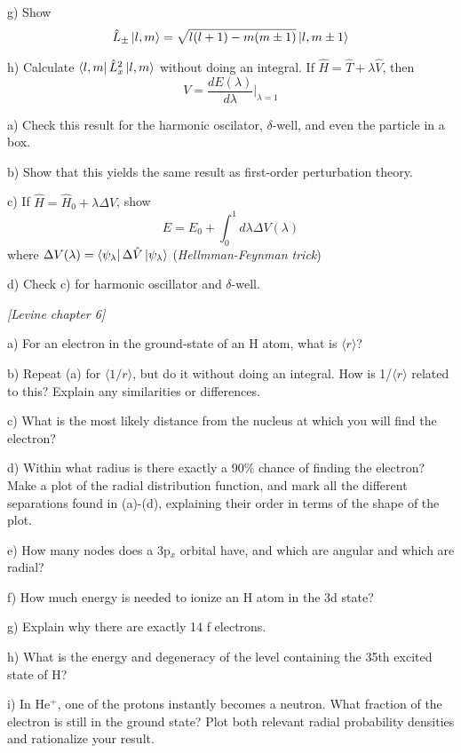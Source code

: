 g) Show
\begin{align*}
\hat{L}_{\pm}\ket{l,m} = \sqrt{l(l+1)-m(m\pm1)}\ket{l,m\pm1}
\end{align*}

h) Calculate $\bra{l,m}\hat{L}^2_x\ket{l,m}$ without doing an integral.
\newpage
{}
If $\hat{H}=\hat{T} + \lambda\hat{V}$, then
$$V = \frac{dE(\lambda)}{d\lambda}\bigg|_{\lambda=1}$$

a) Check this result for the harmonic oscilator, $\delta$-well, and
even the particle in a box.

b) Show that this yields the same result as first-order perturbation
theory.

c) If $\hat{H}=\hat{H}_0+\lambda\Delta\hat{V}$, show 
$$E = E_0 + \int^1_0 d\lambda\Delta V(\lambda)$$
where $\Delta V(\lambda) = \bra{\psi_{\lambda}}\Delta\hat{V}\ket{\psi_{\lambda}}$ ({\em Hellmman-Feynman trick})

d) Check c) for harmonic oscillator and $\delta$-well.

\newpage
{}
{\em [Levine chapter 6]}

a) For an electron in the ground-state of an H atom, what is $\langle r \rangle$?

b) Repeat (a) for $\langle 1/r \rangle$, but do it without doing an integral.  How is 
1/$\langle r \rangle$ related to this?  Explain any similarities or differences.

c) What is the most likely distance from the nucleus at which you will find the electron?

d) Within what radius is there exactly a 90\% chance of finding the electron?
Make a plot of the radial distribution function, and mark all the different separations found in (a)-(d),
explaining their order in terms of the shape of the plot.

e) How many nodes does a 3p$_x$ orbital have, and which are angular and which are radial?

f) How much energy is needed to ionize an H atom in the 3d state?

g) Explain why there are exactly 14 f electrons.

h) What is the energy and degeneracy of the level containing the 35th excited state of H?

i) In He$^+$, one of the protons instantly becomes a neutron.  What fraction of the electron is still  in the ground state?
Plot both relevant radial probability densities and rationalize your result.

